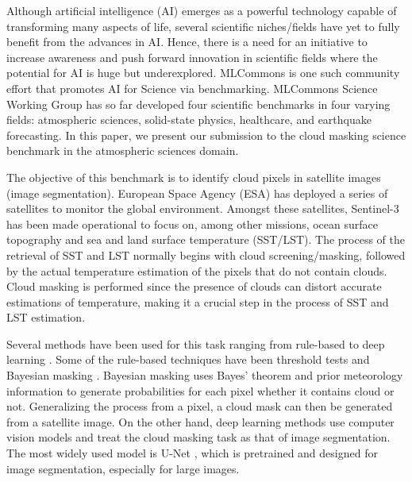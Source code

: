 \documentclass[sigplan,screen]{acmart}
\begin{document}
\nocite{las-2023-ai-workflow} %

Although artificial intelligence (AI) emerges as a powerful technology capable of transforming many aspects of life, several scientific niches/fields have yet to fully benefit from the advances in AI. Hence, there is a need for an initiative to increase awareness and push forward innovation in scientific fields where the potential for AI is huge but underexplored. 
MLCommons \cite{www-mlcommons-research}  is one such community effort that promotes AI for Science via benchmarking. MLCommons Science Working Group \cite{Thiyagalingam2022AIBF} has so far developed four scientific benchmarks in four varying fields: atmospheric sciences, solid-state physics, healthcare, and earthquake forecasting. In this paper, we present our submission to the cloud masking science benchmark in the atmospheric sciences domain. 

The objective of this benchmark \cite{Thiyagalingam2022AIBF} is to identify cloud pixels in satellite images (image segmentation). European Space Agency (ESA) \cite{www-sentinel92} has deployed a series of satellites to monitor the global environment. Amongst these satellites, Sentinel-3 has been made operational to focus on, among other missions, ocean surface topography and sea and land surface temperature (SST/LST). The process of the retrieval of SST and LST normally begins with cloud screening/masking, followed by the actual temperature estimation of the pixels that do not contain clouds. Cloud masking is performed since the presence of clouds can distort accurate estimations of temperature, making it a crucial step in the process of SST and LST estimation. 

Several methods have been used for this task ranging from rule-based \cite{Saunders1986AnAS,Saunders1988AnIM,Merchant2005ProbabilisticPB, Zhu2012ObjectbasedCA} to deep learning \cite{Li2019DeepLB,Domnich2021KappaMaskAC,Yan2018CloudAC,WIELAND2019111203,JEPPESEN2019247}. Some of the rule-based techniques have been threshold tests \cite{Saunders1986AnAS,Saunders1988AnIM} and Bayesian masking \cite{Merchant2005ProbabilisticPB}. Bayesian masking uses Bayes' theorem and prior meteorology information to generate probabilities for each pixel whether it contains cloud or not. Generalizing the process from a pixel, a cloud mask can then be generated from a satellite image. On the other hand, deep learning methods \cite{Li2019DeepLB,Domnich2021KappaMaskAC,Yan2018CloudAC,WIELAND2019111203,JEPPESEN2019247} use computer vision models and treat the cloud masking task as that of image segmentation. The most widely used model is U-Net \cite{Ronneberger2015UNetCN}, which is pretrained and designed for image segmentation, especially for large images.
\end{document}
